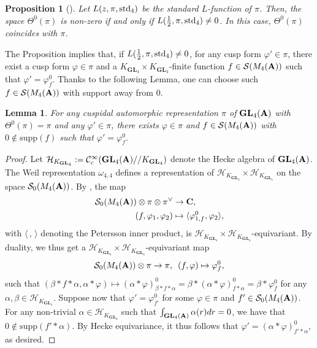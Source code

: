 \documentclass[11pt, reqno]{amsart}
\theoremstyle{plain}
\newtheorem{lemma}[theorem]{Lemma}
\newtheorem{proposition}[theorem]{Proposition}
\theoremstyle{definition}
\theoremstyle{remark}
\theoremstyle{plain}
\def\C{{\bf C}}
\def\A{{\bf A}}
\def\GL{\mathbf{GL}}
\begin{document}
\begin{proposition}[{\cite[Theorem 1]{Watanabe:Global:Theta}}]\label{Watanabe:Theta:Main}
Let $L(z,\pi,{\rm std}_4)$ be the standard $L$-function of $\pi$. Then, the space $\Theta^0(\pi)$ is non-zero if and only if $L(\tfrac{1}{2},\pi,{\rm std}_4) \ne 0$. In this case, $\Theta^0(\pi)$ coincides with $\pi$.  
\end{proposition}

\noindent The Proposition implies that, if $L(\tfrac{1}{2},\pi,{\rm std}_4)\neq 0$, for any cusp form $\varphi' \in \pi$, there exist a cusp form $\varphi\in \pi$ and a $K_{\GL_4}\times K_{\GL_4}$-finite function $f\in \mathcal{S}(M_4(\A))$ such that $\varphi' = \varphi^{0}_f$. Thanks to the following Lemma, one can choose such $f \in \mathcal{S}(M_4(\A))$ with support away from $0$.

\begin{lemma}\label{Support:Away:From:0}
    For any cuspidal automorphic representation $\pi$ of $\GL_4(\A)$ with $\Theta^0(\pi) = \pi$ and any $\varphi' \in \pi$, there exists $\varphi \in \pi$ and $f\in \mathcal{S}(M_4(\A))$ with $0\not\in\mathrm{supp}(f)$ such that $\varphi' = \varphi^0_f$.
\end{lemma}
\begin{proof}
    Let $\mathcal{H}_{K_{\GL_4}} :=\mathcal{C}^{\infty}_c(\GL_4(\A)//K_{\GL_4})$ denote the Hecke algebra of $\GL_4(\A)$. The Weil representation $\omega_{4,4}$ defines a representation of $\mathcal{H}_{K_{\GL_4}}\times \mathcal{H}_{K_{\GL_4}}$ on the space $\mathcal{S}_0(M_4(\A))$. By \cite[Proof of Theorem 2]{Watanabe:Global:Theta}, the map
    \begin{align*}
        \mathcal{S}_0(M_{4}(\A)) \otimes \pi \otimes \pi^\vee&\to \C,\\        (f,\varphi_1,\varphi_2)&\mapsto \langle\varphi_{1,f}^0,\varphi_2\rangle, 
    \end{align*}
    with $\langle\,,\,\rangle$ denoting the Petersson inner product, is $\mathcal{H}_{K_{\GL_4}}\times \mathcal{H}_{K_{\GL_4}}$-equivariant. By duality, we thus get a $\mathcal{H}_{K_{\GL_4}}\times \mathcal{H}_{K_{\GL_4}}$-equivariant map   \begin{align*}
        \mathcal{S}_0(M_{4}(\A)) \otimes \pi \to \pi,\,\,\,        (f,\varphi)\mapsto \varphi_{f}^0, 
    \end{align*}
    such that $(\beta * f * \alpha , \alpha * \varphi) \mapsto  (\alpha * \varphi)^0_{\beta * f * \alpha} = \beta * (\alpha * \varphi)^0_{f * \alpha} =\beta * \varphi^0_{f} $ for any $\alpha, \beta \in \mathcal{H}_{K_{\GL_4}}$.
    Suppose now that $\varphi' = \varphi^0_{f'}$ for some $\varphi \in \pi$ and $f '\in \mathcal{S}_0(M_{4}(\A))$. For any non-trivial $\alpha\in \mathcal{H}_{K_{\GL_4}}$ such that $\int_{\GL_4(\A)}\alpha(r)dr = 0$, we have that $0\not\in\mathrm{supp}(f'*\alpha)$. By Hecke equivariance, it thus follows that $\varphi' = (\alpha * \varphi)^0_{f'*\alpha}$, as desired. 
\end{proof}
\end{document}
